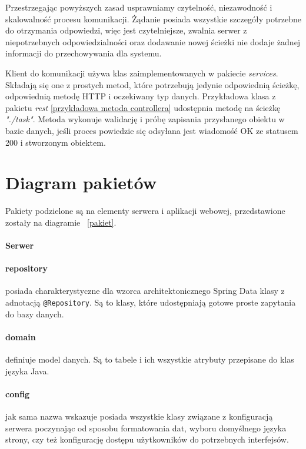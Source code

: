 Przestrzegając powyższych zasad usprawniamy czytelność,  niezawodność i skalowalność procesu komunikacji. Żądanie posiada wszystkie szczegóły potrzebne do otrzymania odpowiedzi, więc jest czytelniejsze, zwalnia serwer z niepotrzebnych odpowiedzialności oraz dodawanie nowej ścieżki nie dodaje żadnej informacji do przechowywania dla systemu. \cite{Rest}

Klient do komunikacji używa klas zaimplementowanych w pakiecie \textit{services}. Składają się one z prostych metod, które potrzebują jedynie odpowiednią ścieżkę, odpowiednią metodę HTTP i oczekiwany typ danych.
Przykładowa klasa z pakietu \textit{rest}  \ref{przykładowa metoda controllera}  udostępnia metodę na ścieżkę \textit{"./task"}. Metoda wykonuje walidację i próbę zapisania przysłanego obiektu w bazie danych, jeśli proces powiedzie się odsyłana jest wiadomość OK ze statusem 200 i stworzonym obiektem.

\clearpage
\section{Diagram pakietów}

Pakiety podzielone są na elementy serwera i aplikacji webowej, przedstawione zostały na diagramie ~\ref{pakiet}.
\paragraph{Serwer }
\paragraph{repository}
posiada charakterystyczne dla wzorca architektonicznego Spring Data klasy z adnotacją \linebreak \texttt{@Repository}. Są to klasy, które udostępniają gotowe proste zapytania do
bazy danych.
\paragraph{domain}

definiuje model danych. Są to tabele i ich wszystkie atrybuty przepisane do klas języka Java.
\paragraph{config}
jak sama nazwa wskazuje posiada wszystkie klasy związane z konfiguracją serwera poczynając od sposobu formatowania dat, wyboru domyślnego języka strony, czy też konfigurację dostępu użytkowników do potrzebnych interfejsów.
